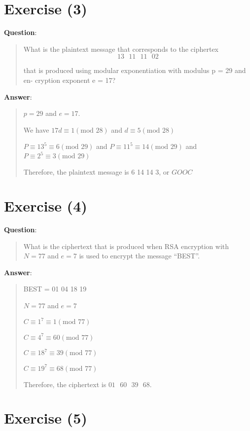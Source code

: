 \documentclass{article} %
\begin{document}
\section*{Exercise (3)}

\bigskip
\noindent
\textbf{Question}:
\begin{quote}
    What is the plaintext message that corresponds to the ciphertex
    \[13 \text{ } 11 \text{ } 11 \text{ } 02\]

    that is produced using modular exponentiation with modulus p = 29 and en-
    cryption exponent e = 17?
\end{quote}

\bigskip
\noindent
\textbf{Answer}:
\begin{quote}
    $p = 29$ and $e = 17$.

    We have $17d \equiv 1 (\text{mod }28)$ and $d \equiv 5 (\text{mod }28)$

    $P \equiv 13^5 \equiv 6(\text{mod }29)$ and $P \equiv 11^5 \equiv 14(\text{mod }29)$ and $P \equiv 2^5 \equiv 3(\text{mod }29)$

    Therefore, the plaintext message is 6 14 14 3, or $\boxed{G O O C}$
\end{quote}

\section*{Exercise (4)}

\bigskip
\noindent
\textbf{Question}:
\begin{quote}
    What is the ciphertext that is produced when RSA encryption with $N = 77$
    and $e = 7$ is used to encrypt the message “BEST”.
\end{quote}

\bigskip
\noindent
\textbf{Answer}:
\begin{quote}
    BEST = 01 04 18 19

    $N = 77$ and $e = 7$

    $C \equiv 1 ^ 7 \equiv 1 (\text{mod }77)$


    $C \equiv 4 ^ 7 \equiv 60 (\text{mod }77)$


    $C \equiv 18 ^ 7 \equiv 39 (\text{mod }77)$


    $C \equiv 19 ^ 7 \equiv 68(\text{mod }77)$

    Therefore, the ciphertext is $\boxed{01 \text{ }60\text{ } 39\text{ } 68}$.
\end{quote}


\section*{Exercise (5)}
\end{document}
